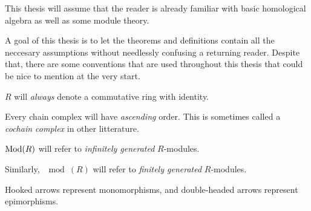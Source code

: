 This thesis will assume that the reader is already familiar with basic homological algebra as well as some module theory.

A goal of this thesis is to let the theorems and definitions contain all the neccesary assumptions without needlessly confusing a returning reader. Despite that, there are some conventions that are used throughout this thesis that could be nice to mention at the very start.

\begin{notation}
    \( R \) will \emph{always} denote a commutative ring with identity.
\end{notation}

\begin{notation}
    Every chain complex will have \emph{ascending} order. This is sometimes called a \emph{cochain complex} in other litterature.
\end{notation}

\begin{notation}
    \( \operatorname{Mod}(R) \) will refer to \emph{infinitely generated} \( R \)-modules.

    Similarly, \( \mod(R) \) will refer to \emph{finitely generated} \( R \)-modules.
\end{notation}

\begin{notation}
    Hooked arrows represent monomorphisms, and double-headed arrows represent epimorphisms.
\end{notation}


